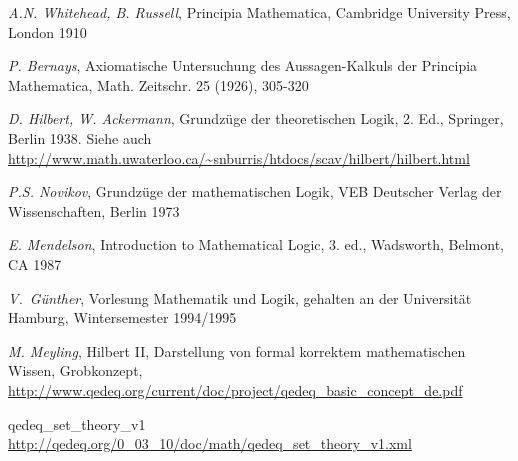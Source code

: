 \documentclass[a4paper,german,10pt,twoside]{book}
\theoremstyle{definition}
\theoremstyle{remark}
\begin{document}
\begin{thebibliography}{99}
 \emph{A.N. Whitehead, B. Russell}, Principia Mathematica, Cambridge University Press, London 1910

 \emph{P. Bernays}, Axiomatische Untersuchung des Aussagen-Kalkuls der {\glqq Principia Mathematica\grqq}, Math. Zeitschr. 25 (1926), 305-320

 \emph{D. Hilbert, W. Ackermann}, Grundz{\"u}ge der theoretischen Logik, 2. Ed., Springer, Berlin 1938. Siehe auch \url{http://www.math.uwaterloo.ca/~snburris/htdocs/scav/hilbert/hilbert.html}

 \emph{P.S. Novikov}, Grundz{\"u}ge der mathematischen Logik, VEB Deutscher Verlag der Wissenschaften, Berlin 1973

 \emph{E. Mendelson}, Introduction to Mathematical Logic, 3. ed., Wadsworth, Belmont, CA 1987

 \emph{V.~G{\"u}nther}, Vorlesung {\glqq Mathematik und Logik\grqq}, gehalten an der Universit{\"a}t Hamburg, Wintersemester 1994/1995

 \emph{M. Meyling}, Hilbert II, Darstellung von formal korrektem mathematischen Wissen, Grobkonzept, \url{http://www.qedeq.org/current/doc/project/qedeq_basic_concept_de.pdf}



 qedeq\_set\_theory\_v1 \url{http://qedeq.org/0_03_10/doc/math/qedeq_set_theory_v1.xml}


\end{thebibliography}
\backmatter

 \printindex
\end{document}
